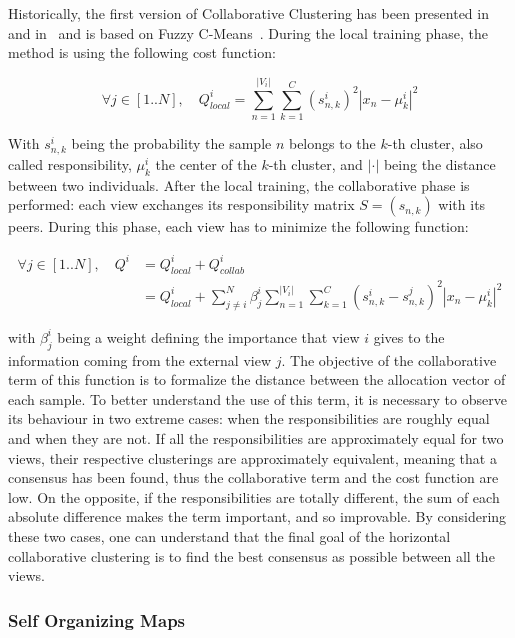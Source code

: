     Historically, the first version of Collaborative Clustering has been presented in~\cite{grozavu2010topological} and in~\cite{pedrycz2004fuzzy} and is based on Fuzzy C-Means~\cite{bezdek1984fcm}. During the local training phase, the method is using the following cost function:

    \begin{equation}
    \forall j \in [1..N], \quad Q^i_{local} = \sum_{n=1}^{|V_i|}\sum_{k=1}^C{(s_{n,k}^i)}^2|x_n - \mu_k^i|^2
        \label{eq:local_fcm}
    \end{equation}

    With $s_{n,k}^i$ being the probability the sample $n$ belongs to the $k$-th cluster, also called responsibility, $\mu_k^i$ the center of the $k$-th cluster, and $|\cdot|$ being the distance between two individuals. After the local training, the collaborative phase is performed: each view exchanges its responsibility matrix $S = (s_{n,k})$ with its peers. During this phase, each view has to minimize the following function:

    \begin{align}
        \forall j \in [1..N], \quad Q^i &= Q^i_{local} + Q^i_{collab}\\
    &= Q^i_{local} + \sum_{j\neq i}^N \beta^i_j\sum_{n=1}^{|V_i|}\sum_{k=1}^C{(s_{n,k}^i - s_{n,k}^j)}^2|x_n-\mu_k^i|^2
    \end{align}
    
    with $\beta^i_j$ being a weight defining the importance that view $i$ gives to the information coming from the external view $j$. The objective of the collaborative term of this function is to formalize the distance between the allocation vector of each sample. To better understand the use of this term, it is necessary to observe its behaviour in two extreme cases: when the responsibilities are roughly equal and when they are not. If all the responsibilities are approximately equal for two views, their respective clusterings are approximately equivalent, meaning that a consensus has been found, thus the collaborative term and the cost function are low. On the opposite, if the responsibilities are totally different, the sum of each absolute difference makes the term important, and so improvable. By considering these two cases, one can understand that the final goal of the horizontal collaborative clustering is to find the best consensus as possible between all the views.

    \subsubsection{Self Organizing Maps}
\label{sec:survey_som}

